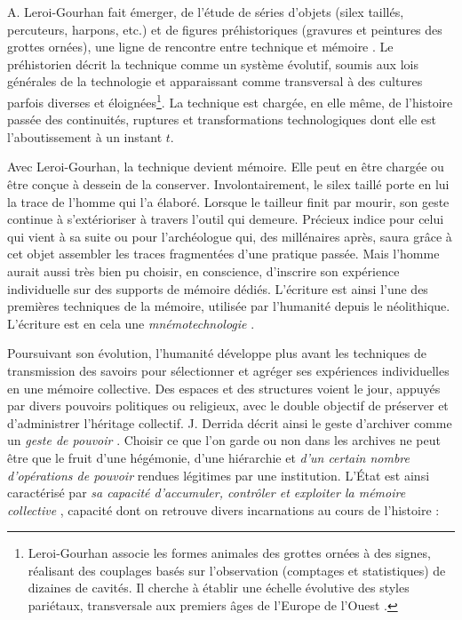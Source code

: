 \documentclass[symmetric,justified,marginals=raggedouter]{tufte-book}
\begin{document}
A. Leroi-Gourhan fait émerger, de l'étude de séries d'objets (silex taillés, percuteurs, harpons, etc.) et de figures préhistoriques (gravures et peintures des grottes ornées), une ligne de rencontre entre technique et mémoire \citep{leroi-gourhan_geste_1964}. Le préhistorien décrit la technique comme un système évolutif, soumis aux lois générales de la technologie et apparaissant comme transversal à des cultures parfois diverses et éloignées\footnote{\RaggedOuter 
Leroi-Gourhan associe les formes animales des grottes ornées à des signes, réalisant des couplages basés sur l'observation (comptages et statistiques) de dizaines de cavités. Il cherche à établir une échelle évolutive des styles pariétaux, transversale aux premiers âges de l'Europe de l'Ouest \citep{leroi-gourham_art_1984}.}. La technique est chargée, en elle même, de l'histoire passée des continuités, ruptures et transformations technologiques dont elle est l'aboutissement à un instant $t$.   

Avec Leroi-Gourhan, la technique devient mémoire. Elle peut en être chargée ou être conçue à dessein de la conserver. Involontairement, le silex taillé porte en lui la trace de l'homme qui l'a élaboré. Lorsque le tailleur finit par mourir, son geste continue à s'extérioriser à travers l'outil qui demeure. Précieux indice pour celui qui vient à sa suite ou pour l'archéologue qui, des millénaires après, saura grâce à cet objet assembler les traces fragmentées d'une pratique passée. Mais l'homme aurait aussi très bien pu choisir, en conscience, d'inscrire son expérience individuelle sur des supports de mémoire dédiés. L'écriture est ainsi l'une des premières techniques de la mémoire, utilisée par l'humanité depuis le néolithique. L'écriture est en cela une \textit{mnémotechnologie} \citep{stiegler_leroi-gourhan:_1998}. 

Poursuivant son évolution, l'humanité développe plus avant les techniques de transmission des savoirs pour sélectionner et agréger ses expériences individuelles en une mémoire collective. Des espaces et des structures voient le jour, appuyés par divers pouvoirs politiques ou religieux, avec le double objectif de préserver et d'administrer l'héritage collectif. J. Derrida décrit ainsi le geste d'archiver comme un \og \textit{geste de pouvoir} \fg{} \citep[p.60]{derrida_trace_2014}. Choisir ce que l'on garde ou non dans les archives ne peut être que le fruit d'une hégémonie, d'une hiérarchie et \og \textit{d'un certain nombre d'opérations de pouvoir} \fg{} rendues légitimes par une institution. L'État est ainsi caractérisé par \og \textit{sa capacité d'accumuler, contrôler et exploiter la mémoire collective} \fg{} \citep{stiegler_etat_1991}, capacité dont on retrouve divers incarnations au cours de l'histoire :
\end{document}
